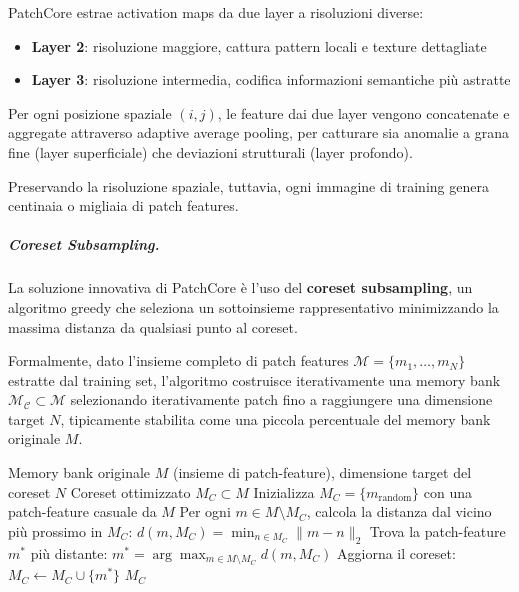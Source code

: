 PatchCore estrae activation maps da due layer a risoluzioni diverse:
\begin{itemize}
    \item \textbf{Layer 2}: risoluzione maggiore, cattura pattern locali e texture dettagliate
    \item \textbf{Layer 3}: risoluzione intermedia, codifica informazioni semantiche più astratte
\end{itemize}

Per ogni posizione spaziale $(i,j)$, le feature dai due layer vengono concatenate e aggregate attraverso adaptive average pooling, per catturare sia anomalie a grana fine (layer superficiale) che deviazioni strutturali (layer profondo). 

Preservando la risoluzione spaziale, tuttavia, ogni immagine di training genera centinaia o migliaia di patch features. 

\subparagraph{Coreset Subsampling.}

La soluzione innovativa di PatchCore è l'uso del \textbf{coreset subsampling}, un algoritmo greedy che seleziona un sottoinsieme rappresentativo minimizzando la massima distanza da qualsiasi punto al coreset.

Formalmente, dato l'insieme completo di patch features $\mathcal{M} = \{m_1, \dots, m_N\}$ estratte dal training set, l'algoritmo costruisce iterativamente una memory bank $\mathcal{M_C} \subset \mathcal{M}$ selezionando iterativamente patch fino a raggiungere una dimensione target $N$, tipicamente stabilita come una piccola percentuale del memory bank originale $M$.

\begin{algorithm}[H]
\caption{Greedy Minimax Facility Location Coreset Selection for PatchCore}
\label{alg:patchcore_coreset}
\begin{algorithmic}[1]
\Require Memory bank originale $M$ (insieme di patch-feature), dimensione target del coreset $N$
\Ensure Coreset ottimizzato $M_C \subset M$
\State Inizializza $M_C = \{m_{\text{random}}\}$ con una patch-feature casuale da $M$
    \State Per ogni $m \in M \setminus M_C$, calcola la distanza dal vicino più prossimo in $M_C$:
    \State \quad $d(m, M_C) = \min_{n \in M_C} \|m - n\|_2$
    \State Trova la patch-feature $m^*$ più distante:
    \State \quad $\displaystyle m^* = \arg\max_{m \in M \setminus M_C} d(m, M_C)$
    \State Aggiorna il coreset: $M_C \leftarrow M_C \cup \{m^*\}$
\EndWhile
\State \Return $M_C$
\end{algorithmic}
\end{algorithm}

